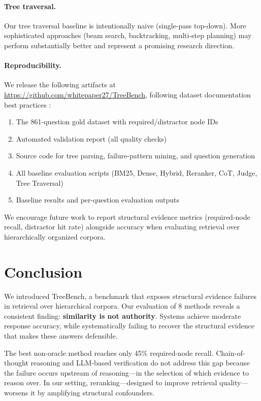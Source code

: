 \documentclass[11pt]{article}
\begin{document}
\paragraph{Tree traversal.} Our tree traversal baseline is intentionally naive (single-pass top-down). More sophisticated approaches (beam search, backtracking, multi-step planning) may perform substantially better and represent a promising research direction.

\paragraph{Reproducibility.} We release the following artifacts at \url{https://github.com/whitepaper27/TreeBench}, following dataset documentation best practices \citep{gebru2021datasheets}:
\begin{enumerate}[nosep]
    \item The 861-question gold dataset with required/distractor node IDs
    \item Automated validation report (all quality checks)
    \item Source code for tree parsing, failure-pattern mining, and question generation
    \item All baseline evaluation scripts (BM25, Dense, Hybrid, Reranker, CoT, Judge, Tree Traversal)
    \item Baseline results and per-question evaluation outputs
\end{enumerate}
We encourage future work to report structural evidence metrics (required-node recall, distractor hit rate) alongside accuracy when evaluating retrieval over hierarchically organized corpora.


\section{Conclusion}
\label{sec:conclusion}

We introduced TreeBench, a benchmark that exposes structural evidence failures in retrieval over hierarchical corpora. Our evaluation of 8 methods reveals a consistent finding: \textbf{similarity is not authority}. Systems achieve moderate response accuracy, while systematically failing to recover the structural evidence that makes these answers defensible.

The best non-oracle method reaches only 45\% required-node recall. Chain-of-thought reasoning and LLM-based verification do not address this gap because the failure occurs upstream of reasoning---in the selection of which evidence to reason over. In our setting, reranking---designed to improve retrieval quality---worsens it by amplifying structural confounders.
\end{document}
